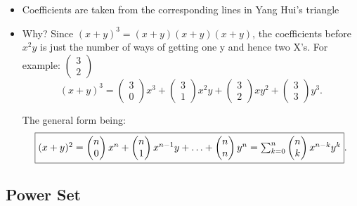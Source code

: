 \documentclass[a4paper]{article}
\numberwithin{counter}{subsection}
\theoremstyle{break}
\begin{document}
				\begin{itemize}
					\item Coefficients are taken from the corresponding lines in Yang Hui's triangle
					\item Why? Since $(x+y)^3=(x+y)(x+y)(x+y)$, the coefficients before $x^2y$ is just the number of ways of getting one y and hence two X's. For example: $\begin{pmatrix} 3 \\ 2 \end{pmatrix} $ \[
						(x+y)^3 = \begin{pmatrix} 3 \\ 0 \end{pmatrix} x^3 + \begin{pmatrix} 3 \\ 1 \end{pmatrix} x^2y + \begin{pmatrix} 3 \\ 2 \end{pmatrix} xy^2 + \begin{pmatrix} 3 \\ 3 \end{pmatrix} y^3
					.\] 

					The general form being: \[
						\fbox{$(x+y)^{2}= \begin{pmatrix} n \\ 0 \end{pmatrix}x^{n} + \begin{pmatrix} n \\ 1 \end{pmatrix} x^{n-1}y + \ldots + \begin{pmatrix} n \\ n \end{pmatrix} y^{n} = \sum_{k=0}^{n} \begin{pmatrix} n \\ k \end{pmatrix} x^{n - k} y^{k}$} 
					.\] 
						
				\end{itemize}

		\subsection{Power Set}%
		
\end{document}
